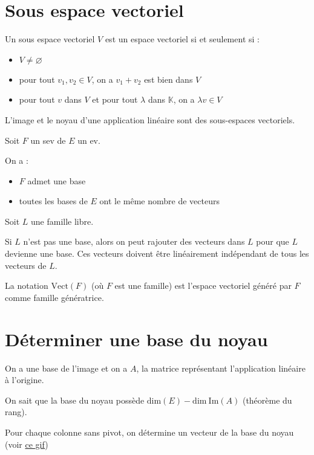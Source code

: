 \documentclass[a4paper, titlepage]{article}
\begin{document}
	\section{Sous espace vectoriel}
	\begin{defn}
		Un sous espace vectoriel $V$ est un espace vectoriel si et seulement si :
		\begin{itemize}
			\item $V\neq \varnothing$
			\item pour tout $v_1,v_2\in V$, on a $v_1+v_2$ est bien dans $V$
			\item pour tout $v$ dans $V$ et pour tout $\lambda$ dans $\mathbb{K}$, on a $\lambda v\in V$
		\end{itemize}
	\end{defn}
	\begin{props}
		L'image et le noyau d'une application linéaire sont des sous-espaces vectoriels.
	\end{props}
	\begin{thm}
		Soit $F$ un sev de $E$ un ev.

		On a :
		\begin{itemize}
			\item $F$ admet une base
			\item toutes les bases de $E$ ont le même nombre de vecteurs
		\end{itemize}
	\end{thm}
	\begin{thm}
		Soit $L$ une famille libre.

		Si $L$ n'est pas une base, alors on peut rajouter des vecteurs dans $L$ pour que $L$ devienne une base. Ces vecteurs doivent être linéairement indépendant de tous les vecteurs de $L$.
	\end{thm}
	\begin{defn}
		La notation $\mathrm{Vect}(F)$ (où $F$ est une famille) est l'espace vectoriel généré par $F$ comme famille génératrice.
	\end{defn}
	\section{Déterminer une base du noyau}
	On a une base de l'image et on a $A$, la matrice représentant l'application linéaire à l'origine.

	On sait que la base du noyau possède $\mathrm{dim}(E)-\mathrm{dim}~\mathrm{Im}(A)$ (théorème du rang).
	
	Pour chaque colonne sans pivot, on détermine un vecteur de la base du noyau (voir \href{https://giphy.com/gifs/5cKfoYHIVk2kK5BE1G}{ce gif})
\end{document}
